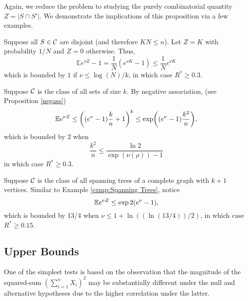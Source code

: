 \documentclass[10pt, oneside]{article}
\begin{document}
Again, we reduce the problem to studying the purely combinatorial quantity $Z = |S \cap S'|$. We demonstrate the implications of this proposition via a few examples.
\begin{exmp}
  Suppose all $S\in{\mathcal C}$ are disjoint (and therefore $KN\le n$). Let $Z = K$ with probability $1/N$ and $Z = 0$ otherwise. Thus,
  \[
  \mathbb{E} e^{\nu Z} -1 = \frac{1}{N} (e^{\nu K} -1)
  \le\frac{1}{N} e^{\nu K}
  \]
  which is bounded by $1$ if $\nu\le\log(N)/k$, in which case $R^* \ge0.3$.
\end{exmp}

\begin{exmp}
  Suppose ${\mathcal C}$ is the class of all sets of size $k$. By negative association, (see Proposition \ref{negass})
  \[
  \mathbb{E} e^{\nu Z} \le\biggl((e^\nu-1) \frac{k}{n}+1\biggr)^k
  \le\exp\biggl((e^\nu-1) \frac{k^2}{n}\biggr),
  \]
  which is bounded by 2 when 
  $$\frac{k^2}{n} \le\frac{\ln2}{\exp(\nu(\rho)) -1}$$
  in which case $R^* \ge0.3$.
\end{exmp}


\begin{exmp}
  Suppose ${\mathcal C}$ is the class of all spanning trees of a complete graph with $k+1$ vertices. Similar to Example \ref{exmp:Spanning Trees}, notice
  \[
  \mathbb{E} e^{\nu Z} \le \exp{2(e^\nu-1)},
  \]
  which is bounded by 13/4 when $\nu\le1+\ln((\ln(13/4))/2)$, in which case $R^* \ge0.15$.
\end{exmp}


\subsection{Upper Bounds}
One of the simplest tests is based on the observation that
the magnitude of the squared-sum $(\sum_{i=1}^n X_i)^2$ may be
substantially different under the null and alternative hypotheses due
to the higher correlation under the latter.
\end{document}
